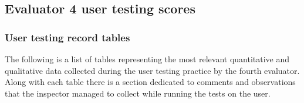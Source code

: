 
\subsection{Evaluator 4 user testing scores}

\subsubsection*{User testing record tables}
The following is a list of tables representing the most relevant quantitative and qualitative data collected during the user testing practice by the fourth evaluator.
Along with each table there is a section dedicated to comments and observations that the inspector managed to collect while running the tests on the user.

\vspace{0.8cm}

